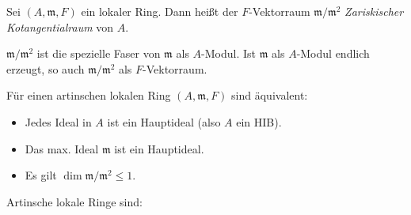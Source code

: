 \documentclass{cheat-sheet}
\newcommand{\mmm}{\mathfrak{m}}
\begin{document}

\begin{defn}
  Sei $(A, \mmm, F)$ ein lokaler Ring.
  Dann heißt der $F$-Vektorraum $\mmm / \mmm^2$ \emph{Zariskischer Kotangentialraum} von $A$.
\end{defn}

\begin{bem}
  $\mmm / \mmm^2$ ist die spezielle Faser von $\mmm$ als $A$-Modul.
  Ist $\mmm$ als $A$-Modul endlich erzeugt, so auch $\mmm / \mmm^2$ als $F$-Vektorraum.
\end{bem}

\begin{prop}
  Für einen artinschen lokalen Ring $(A, \mmm, F)$ sind äquivalent:
  \begin{itemize}
    \item Jedes Ideal in $A$ ist ein Hauptideal (also $A$ ein HIB).
    \item Das max. Ideal $\mmm$ ist ein Hauptideal.
    \item Es gilt $\dim \mmm / \mmm^2 \leq 1$.
  \end{itemize}
\end{prop}

\begin{bspe}
  Artinsche lokale Ringe sind:
  \begin{itemize}
     \quad
  \end{itemize}
\end{bspe}
\end{document}
